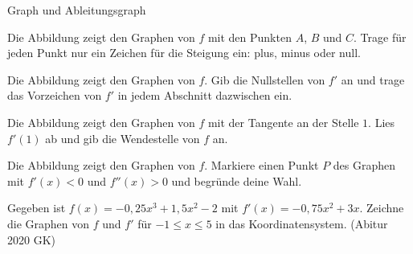 \setcounter{aufgabe}{29}

\begin{aufgabe}{Graph und Ableitungsgraph}
\begin{teile}
\teil Die Abbildung zeigt den Graphen von $f$ mit den Punkten $A$, $B$ und $C$. Trage für jeden Punkt nur ein Zeichen für die Steigung ein: plus, minus oder null.

\begin{ksys}[xmin=-3,xmax=3,ymin=-3,ymax=3,ablesen]     \end{ksys}
\teil Die Abbildung zeigt den Graphen von $f$. Gib die Nullstellen von $f'$ an und trage das Vorzeichen von $f'$ in jedem Abschnitt dazwischen ein.

\begin{ksys}[xmin=-3,xmax=3,ymin=-3,ymax=3,ablesen]  \end{ksys}
\teil Die Abbildung zeigt den Graphen von $f$ mit der Tangente an der Stelle $1$. Lies $f'(1)$ ab und gib die Wendestelle von $f$ an.

\begin{ksys}[xmin=-1,xmax=5,ymin=-1,ymax=5,ablesen]   \end{ksys}
\teil Die Abbildung zeigt den Graphen von $f$. Markiere einen Punkt $P$ des Graphen mit $f'(x) < 0$ und $f''(x) > 0$ und begründe deine Wahl.

\begin{ksys}[xmin=-3,xmax=3,ymin=-3,ymax=3]  \end{ksys}
\teil Gegeben ist $f(x) = -0{,}25x^3 + 1{,}5x^2 - 2$ mit $f'(x) = -0{,}75x^2 + 3x$. Zeichne die Graphen von $f$ und $f'$ für $-1 \le x \le 5$ in das Koordinatensystem. \hfill (Abitur 2020 GK)


\end{teile}
\end{aufgabe}
